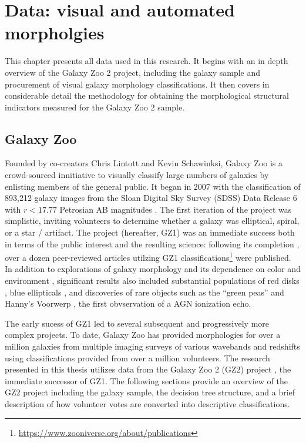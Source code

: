 
\chapter{Data: visual and automated morpholgies}
\label{chap:2}


This chapter presents all data used in this research. It begins with an in depth overview of the Galaxy Zoo 2 project, including the galaxy sample and procurement of visual galaxy morphology classifications. It then covers in considerable detail the methodology for obtaining the morphological structural indicators measured for the Galaxy Zoo 2 sample. 


\section{Galaxy Zoo}
Founded by co-creators Chris Lintott and Kevin Schawinksi, Galaxy Zoo is a crowd-sourced innitiative to visually classify large numbers of galaxies by enlisting members of the general public. It began in 2007 with the classification of 893,212 galaxy images from the Sloan Digital Sky Survey (SDSS) Data Release 6 with $r < 17.77$ Petrosian AB magnitudes \citep{Strauss2002,Adelman2008}. The first iteration of the project was simplistic, inviting volunteers to determine whether a galaxy was elliptical, spiral, or a star / artifact. The project (hereafter, GZ1) was an immediate success both in terms of the public interest and the resulting science: following its completion \citep{Lintott2008}, over a dozen peer-reviewed articles utilzing GZ1 classifications\footnote{\url{https://www.zooniverse.org/about/publications}} were published. In addition to explorations of galaxy morphology and its dependence on color and environment \citep{Skibba2009, Bamford2009}, significant results also included substantial populations of red disks \citep{Masters2010b}, blue ellipticals \citep{Schawinski2009}, and discoveries of rare objects such as the ``green peas'' \citep{Cardamone2009} and Hanny's Voorwerp \citep{Lintott2009}, the first obvservation of a AGN ionization echo. 

The early sucess of GZ1 led to several subsequent and progressively more complex projects. To date, Galaxy Zoo has provided morphologies for over a million galaxies from multiple imaging surveys of various wavebands and redshifts using classifications provided from over a million volunteers. The research presented in this thesis utilizes data from the Galaxy Zoo 2 (GZ2) project \citep{Willett2013}, the immediate successor of GZ1. The following sections provide an overview of the GZ2 project including the galaxy sample, the decision tree structure, and a brief description of how volunteer votes are converted into descriptive classifications. 


